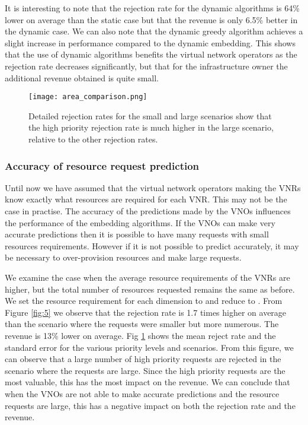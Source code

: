 \documentclass[conference]{IEEEtran}
\begin{document}
It is interesting to note that the rejection rate for the dynamic algorithms is 64\% lower on average than the static case but that the revenue is only 6.5\% better in the dynamic case. We can also note that the dynamic greedy algorithm achieves a slight increase in performance compared to the dynamic embedding. This shows that the use of dynamic algorithms benefits the virtual network operators as the rejection rate decreases significantly, but that for the infrastructure owner the additional revenue obtained is quite small.





\begin{figure}[!t]
\centering
   \texttt{[image: area\_comparison.png]}\hfill
  \caption{{Detailed rejection rates for the small and large scenarios show that the high priority rejection rate is much higher in the large scenario, relative to the other rejection rates.}}\label{fig:6}
\end{figure}

\subsubsection{Accuracy of resource request prediction}
Until now we have assumed that the virtual network operators making the VNRs know exactly what resources are required for each VNR. This may not be the case in practise. The accuracy of the predictions made by the VNOs influences the performance of the embedding algorithms. If the VNOs can make very accurate predictions then it is possible to have many requests with small resources requirements. However if it is not possible to predict accurately, it may be necessary to over-provision resources and make large requests.

We examine the case when the average resource requirements of the VNRs are higher, but the total number of resources requested remains the same as before. We set the resource requirement for each dimension to  and reduce  to . From Figure \ref{fig:5} we observe that the rejection rate is 1.7 times higher on average than the scenario where the requests were smaller but more numerous. The revenue is 13\% lower on average.  Fig \ref{fig:6} shows the mean reject rate and the standard error for the various priority levels and scenarios. From this figure, we can observe that a large number of high priority requests are rejected in the scenario where the requests are large. Since the high priority requests are the most valuable, this has the most impact on the revenue. We can conclude that when the VNOs are not able to make accurate predictions and the resource requests are large, this has a negative impact on both the rejection rate and the revenue.
\end{document}
